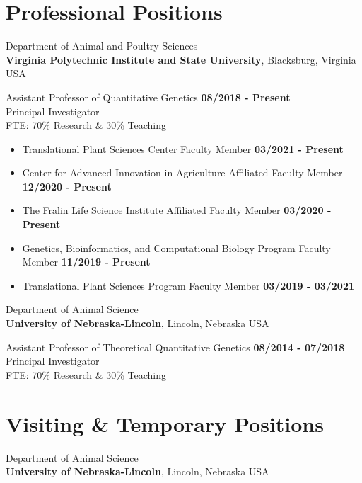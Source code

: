 \documentclass[margin,line,10pt]{res}
\begin{document}
\begin{resume}
\vspace{0.4cm}
\section{\sc Professional Positions}


Department of Animal and Poultry Sciences\\
{\bf Virginia Polytechnic Institute and State University}, Blacksburg, Virginia USA
\vspace{-.3cm}

Assistant Professor of Quantitative Genetics   \hfill {\bf 08/2018 - Present}\\
Principal Investigator \\
FTE: 70\% Research \& 30\% Teaching \\

\begin{itemize}
  \item Translational Plant Sciences Center Faculty Member  \hfill {\bf 03/2021 - Present}\\
  \item Center for Advanced Innovation in Agriculture Affiliated Faculty Member  \hfill {\bf 12/2020 - Present}\\
  \item The Fralin Life Science Institute Affiliated Faculty Member  \hfill {\bf 03/2020 - Present}\\
\item Genetics, Bioinformatics, and Computational Biology Program Faculty Member  \hfill {\bf 11/2019 - Present}\\
\item Translational Plant Sciences Program Faculty Member  \hfill {\bf 03/2019 - 03/2021}\\
\end{itemize}

Department of Animal Science\\
{\bf University of Nebraska-Lincoln}, Lincoln, Nebraska USA
\vspace{-.35cm}

Assistant Professor of Theoretical Quantitative Genetics   \hfill {\bf 08/2014 - 07/2018}\\
Principal Investigator \\
FTE: 70\% Research \& 30\% Teaching \\



\vspace{0.4cm}
\section{\sc Visiting \& Temporary Positions}
Department of Animal Science\\
{\bf University of Nebraska-Lincoln}, Lincoln, Nebraska USA
\vspace{-.35cm}


\end{resume}
\end{document}
